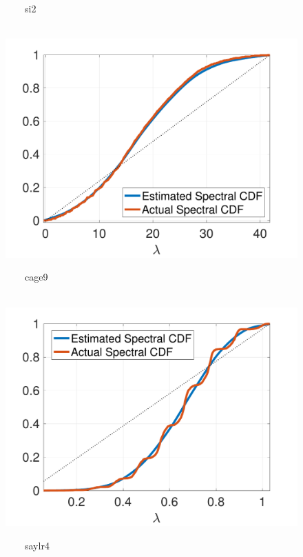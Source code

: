 \documentclass{article}
\begin{document}
\begin{figure}[bt]
\begin{minipage}[m]{0.32\linewidth}
\centerline{\small{~~~~si2}}
\centerline{~~\includegraphics[width=1.1\linewidth]{fig_si2_cdf}}
\end{minipage} 
\begin{minipage}[m]{0.32\linewidth}
\centerline{\small{~~~~cage9}} 
\centerline{~~\includegraphics[width=1.1\linewidth]{fig_cage9_cdf}}
\end{minipage}
\begin{minipage}[m]{0.32\linewidth}
\centerline{\small{~~~~saylr4}} 

\end{minipage}
\end{figure}
\end{document}
